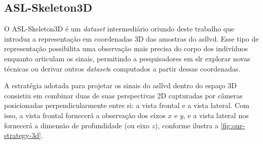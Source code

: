 \subsection{ASL-Skeleton3D}
\label{sec:metodologia-datasets-3d}

O ASL-Skeleton3D é um \textit{dataset} intermediário oriundo deste trabalho que introduz a representação em coordenadas 3D das amostras do \acrshort{asllvd}. Esse tipo de representação possibilita uma observação mais precisa do corpo dos indivíduos enquanto articulam os sinais, permitindo a pesquisadores em \acrshort{slr} explorar novas técnicas ou derivar outros \textit{dataset}s computados a partir dessas coordenadas.

A estratégia adotada para projetar os sinais do \acrshort{asllvd} dentro do espaço 3D consistiu em combinar duas de suas perspectivas 2D capturadas por câmeras posicionadas perpendicularmente entre si: a vista frontal e a vista lateral. Com isso, a vista frontal fornecerá a observação dos eixos \(x\) e \(y\), e a vista lateral nos fornecerá a dimensão de profundidade (ou eixo \( z\)), conforme ilustra a \autoref{fig:our-strategy-3d}.


